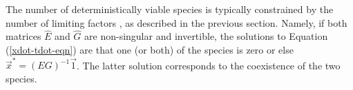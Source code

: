 %
%
The number of deterministically viable species is typically constrained by the number of limiting factors \cite{Armstrong1980}, as described in the previous section. 
Namely, if both matrices $\hat{E}$ and $ \hat{G}$ are non-singular and invertible, the solutions to Equation (\ref{xdot-tdot-eqn}) are that one (or both) of the species is zero or else $\vec{x}^* = (E G)^{-1}\vec{1}$. 
The latter solution corresponds to the coexistence of the two species.

